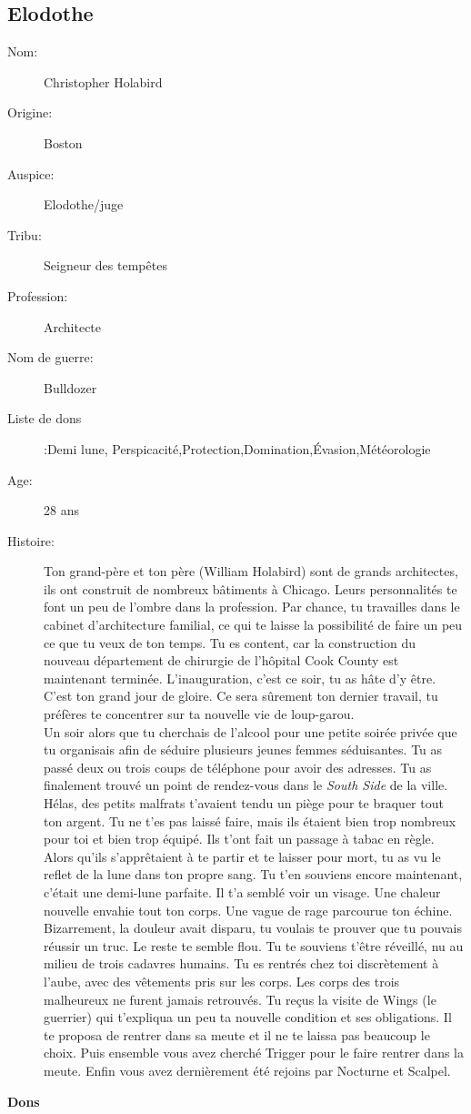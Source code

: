 \documentclass[oneside,12pt]{book}
\begin{document}
\begin{flushleft}
\section{Elodothe}
\begin{description}
\item[Nom:]{Christopher Holabird}
\item[Origine:]{Boston}
\item[Auspice:]{Elodothe/juge}
\item[Tribu:]{Seigneur des tempêtes}
\item[Profession:]{Architecte}
\item[Nom de guerre:]{Bulldozer}
\item[Liste de dons]:Demi lune, Perspicacité,Protection,Domination,Évasion,Météorologie
\item[Age:]{28 ans}
\item[Histoire:]{
Ton grand-père et ton père (William Holabird) sont de grands architectes, ils ont construit de nombreux bâtiments à Chicago. 
Leurs personnalités te font un peu de l'ombre dans la profession.
Par chance, tu travailles dans le cabinet d'architecture familial, ce qui te laisse la possibilité de faire un peu ce que tu veux de ton temps. 
Tu es content, car la construction du nouveau département de chirurgie de l'hôpital Cook County est maintenant terminée.
L'inauguration, c'est ce soir, tu as hâte d'y être. 
C'est ton grand jour de gloire. Ce sera sûrement ton dernier travail, tu préfères te concentrer sur ta nouvelle vie de loup-garou.
\\
Un soir alors que tu cherchais de l'alcool pour une petite soirée privée que tu organisais afin de séduire plusieurs jeunes femmes séduisantes. 
Tu as passé deux ou trois coups de téléphone pour avoir des adresses. 
Tu as finalement trouvé un point de rendez-vous dans le \textit{South Side} de la ville. 
Hélas, des petits malfrats t'avaient tendu un piège pour te braquer tout ton argent. 
Tu ne t'es pas laissé faire, mais ils étaient bien trop nombreux pour toi et bien trop équipé. 
Ils t'ont fait un passage à tabac en règle. Alors qu'ils s'apprêtaient à te partir et te laisser pour mort, tu as vu le reflet de la lune dans ton propre sang. 
Tu t'en souviens encore maintenant, c'était une demi-lune parfaite. Il t'a semblé voir un visage. 
Une chaleur nouvelle envahie tout ton corps. Une vague de rage parcourue ton échine. 
Bizarrement, la douleur avait disparu, tu voulais te prouver que tu pouvais réussir un truc. Le reste te semble flou. 
Tu te souviens t'être réveillé, nu au milieu de trois cadavres humains. 
Tu es rentrés chez toi discrètement à l'aube, avec des vêtements pris sur les corps. 
Les corps des trois malheureux ne furent jamais retrouvés. Tu reçus la visite de Wings (le guerrier) qui t'expliqua un peu ta nouvelle condition et ses obligations. Il te proposa de rentrer dans sa meute et il ne te laissa pas beaucoup le choix.
Puis ensemble vous avez cherché Trigger pour le faire rentrer dans la meute. Enfin vous avez dernièrement été rejoins par Nocturne et Scalpel.
}
\end{description}
\clearpage
\textbf{\large Dons} 
\vspace{0.5cm}



\end{flushleft}
\end{document}

